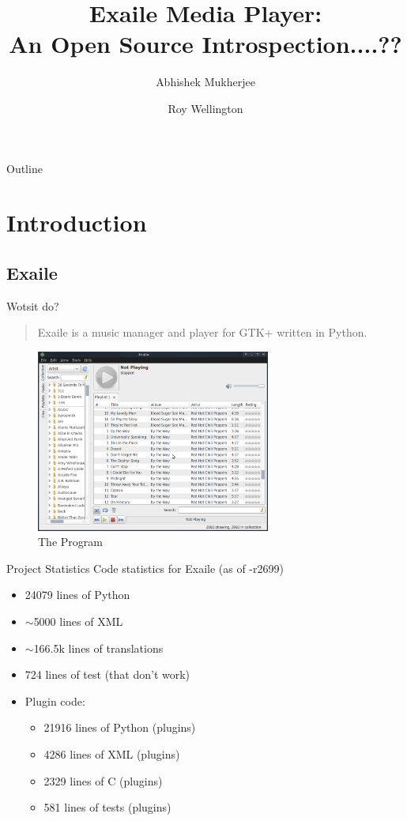 \documentclass{beamer}
\title
{%
  Exaile Media Player:\\
  An Open Source Introspection....?? %
}
\author
{
  Abhishek Mukherjee \and
  Roy Wellington
}
\begin{document}
\begin{frame}
  \titlepage
\end{frame}

\begin{frame}{Outline}
  \tableofcontents
\end{frame}


\section{Introduction}

\subsection{Exaile}

\begin{frame}{Wotsit do?}
  \begin{quote}
    Exaile is a music manager and player for GTK+ written in Python.
  \end{quote}
  \begin{figure}
    \includegraphics[height=60mm]{images/exaile}
    \caption{The Program}
  \end{figure}
\end{frame}

\begin{frame}{Project Statistics}
  Code statistics for Exaile (as of -r2699)
  \begin{itemize}
    \item 24079 lines of Python
    \item $\sim$5000 lines of XML
    \item $\sim$166.5k lines of translations
    \item 724 lines of test (that don't work)
	\item Plugin code:
	\begin{itemize}
      \item 21916 lines of Python (plugins)
      \item 4286 lines of XML (plugins)
      \item 2329 lines of C (plugins)
      \item 581 lines of tests (plugins)
	\end{itemize}
  \end{itemize}
\end{frame}
\end{document}

